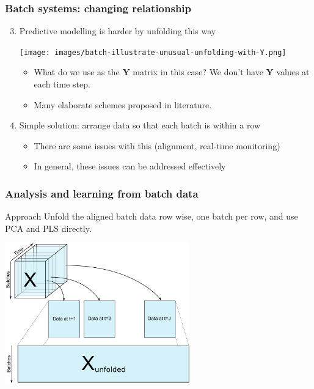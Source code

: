 \documentclass[handout, 12pt]{beamer}
\begin{document}
\begin{frame}\frametitle{Batch systems: changing relationship}
\begin{enumerate}
	\setcounter{enumi}{2}
	\item 	Predictive modelling is harder by unfolding this way

			\begin{center}
				\texttt{[image: images/batch-illustrate-unusual-unfolding-with-Y.png]}
			\end{center}
			
		
			\begin{itemize}
				\item 	What do we use as the \( \mathbf{Y} \) matrix in this case? {\scriptsize We don't have  \( \mathbf{Y} \) values at each time step.}
				\item 	Many elaborate schemes proposed in literature.			
			\end{itemize}
		
	\item 	Simple solution: arrange data so that each batch is within a row
	
			\begin{itemize}
				\item 	There are some issues with this  (alignment, real-time monitoring)
				\item 	In general, these issues can be addressed effectively
			\end{itemize}
\end{enumerate}
\end{frame}

\begin{frame}\frametitle{Analysis and learning from batch data}

	\begin{exampleblock}{Approach}
	Unfold the aligned batch data row wise, one batch per row, and use PCA and PLS directly.
	\end{exampleblock}

	\begin{center}
		\includegraphics[width=8cm]{images/batch-data-unfolding-X-only.png}	
	\end{center}
\end{frame}	
\end{document}
